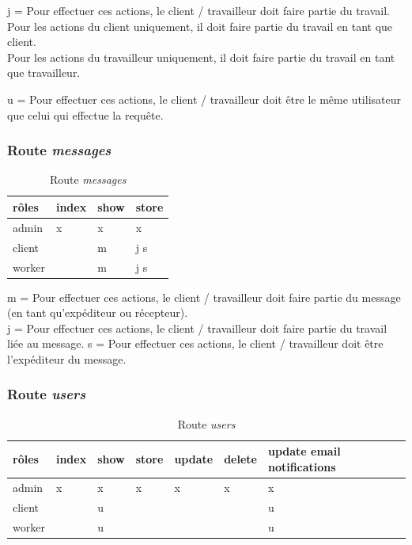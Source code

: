 \documentclass[
    iai, %
    il, %
]{heig-tb}
\begin{document}
j = Pour effectuer ces actions, le client / travailleur doit faire partie du travail. \\
Pour les actions du client uniquement, il doit faire partie du travail en tant que client. \\
Pour les actions du travailleur uniquement, il doit faire partie du travail en tant que travailleur.

u = Pour effectuer ces actions, le client / travailleur doit être le même utilisateur que celui qui effectue la requête.

\subsubsection{Route \emph{messages}}

\begin{table}[h]
    \begin{center}
        \caption{Route \emph{messages} \label{autorisations-route-messages}}
        \begin{tabularx}{1.0\textwidth} {X|X|X|X}
            rôles  & index & show & store \\ \hline
            admin  & x     & x    & x     \\
            client &       & m    & j s   \\
            worker &       & m    & j s   \\
        \end{tabularx}
    \end{center}
\end{table}

m = Pour effectuer ces actions, le client / travailleur doit faire partie du message (en tant qu'expéditeur ou récepteur). \\
j = Pour effectuer ces actions, le client / travailleur doit faire partie du travail liée au message.
s = Pour effectuer ces actions, le client / travailleur doit être l'expéditeur du message.

\subsubsection{Route \emph{users}}

\begin{table}[h]
    \begin{center}
        \caption{Route \emph{users} \label{autorisations-route-users}}
        \begin{tabularx}{1.0\textwidth} {l|l|l|l|l|l|X}
            rôles  & index & show & store & update & delete & update email notifications \\ \hline
            admin  & x     & x    & x     & x      & x      & x                          \\
            client &       & u    &       &        &        & u                          \\
            worker &       & u    &       &        &        & u                          \\
        \end{tabularx}
    \end{center}
\end{table}
\end{document}
